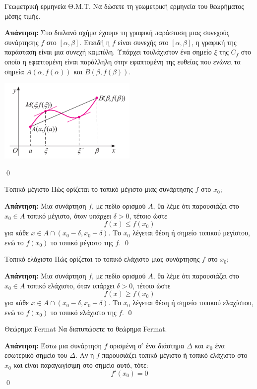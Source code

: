 \documentclass[a4paper, 12pt]{article}
\renewenvironment{proof}[1][\textbf{Απάντηση}]{%
  \par\noindent\textbf{#1:} \rmfamily}{\qed\par}
\begin{document}
\begin{theorem}{Γεωμετρική ερμηνεία Θ.Μ.Τ.}
  Να δώσετε τη γεωμετρική ερμηνεία του θεωρήματος μέσης τιμής.
\end{theorem}
\begin{proof}
  Στο διπλανό σχήμα έχουμε τη γραφική παράσταση μιας συνεχούς συνάρτησης $f$ στο $[α, β]$. Επειδή η $f$ είναι συνεχής στο $[α, β]$, η γραφική της παράσταση είναι μια συνεχή καμπύλη. Υπάρχει τουλάχιστον ένα σημείο $ξ$ της $C_f$ στο οποίο η εφαπτομένη είναι παράλληλη στην εφαπτομένη της ευθείας που ενώνει τα σημεία $A(α, f(α))$ και $B(β, f(β))$.
  \begin{center}
    \includegraphics[width=0.5\textwidth]{images/geoTMT}
  \end{center}
\end{proof}

\begin{theorem}{Τοπικό μέγιστο}
  Πώς ορίζεται το τοπικό μέγιστο μιας συνάρτησης $f$ στο $x_0$;
\end{theorem}
\begin{proof}
  Μια συνάρτηση $f$, με πεδίο ορισμού $A$, θα λέμε ότι παρουσιάζει στο $x_0 \in A$ τοπικό μέγιστο, όταν υπάρχει $δ > 0$, τέτοιο ώστε
  $$f ( x) \leq f ( x_0 )$$
  για κάθε $x \in A \cap ( x_0 − δ , x_0 + δ )$.
  Το $x_0$ λέγεται θέση ή σημείο τοπικού μεγίστου, ενώ το $f(x_0)$ το τοπικό μέγιστο της $f$.
\end{proof}

\begin{theorem}{Τοπικό ελάχιστο}
  Πώς ορίζεται το τοπικό ελάχιστο μιας συνάρτησης $f$ στο $x_0$;
\end{theorem}
\begin{proof}
  Μια συνάρτηση $f$, με πεδίο ορισμού $A$, θα λέμε ότι παρουσιάζει στο $x_0 \in A$ τοπικό ελάχιστο, όταν υπάρχει $δ > 0$, τέτοιο ώστε
  $$f ( x) \geq f ( x_0 )$$
  για κάθε $x \in A \cap ( x_0 − δ , x_0 + δ )$.
  Το $x_0$ λέγεται θέση ή σημείο τοπικού ελαχίστου, ενώ το $f(x_0)$ το τοπικό ελάχιστο της $f$.
\end{proof}

\begin{theorem}{Θεώρημα Fermat}
  Να διατυπώσετε το θεώρημα Fermat.
\end{theorem}
\begin{proof}
  Έστω μια συνάρτηση $f$ ορισμένη σ’ ένα διάστημα $Δ$ και $x_0$ ένα εσωτερικό σημείο του $Δ$. Αν η $f$ παρουσιάζει τοπικό μέγιστο ή τοπικό ελάχιστο στο $x_0$ και είναι παραγωγίσιμη στο σημείο αυτό, τότε:
  $$f ′(x_0) = 0$$
\end{proof}
\end{document}
